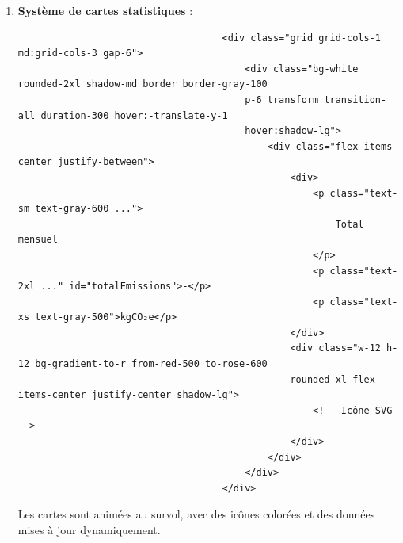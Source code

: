 \documentclass[a4paper,11pt]{article}
\begin{document}
\begin{enumerate}
                        \item \textbf{Système de cartes statistiques} :
                            \begin{tcolorbox}[colback=lightgray!6, colframe=black, left=-70mm, right=5mm, top=2mm, bottom=0mm, boxrule=0.1mm]
                                \begin{verbatim}
                                    <div class="grid grid-cols-1 md:grid-cols-3 gap-6">
                                        <div class="bg-white rounded-2xl shadow-md border border-gray-100 
                                        p-6 transform transition-all duration-300 hover:-translate-y-1 
                                        hover:shadow-lg">
                                            <div class="flex items-center justify-between">
                                                <div>
                                                    <p class="text-sm text-gray-600 ...">
                                                        Total mensuel
                                                    </p>
                                                    <p class="text-2xl ..." id="totalEmissions">-</p>
                                                    <p class="text-xs text-gray-500">kgCO₂e</p>
                                                </div>
                                                <div class="w-12 h-12 bg-gradient-to-r from-red-500 to-rose-600 
                                                rounded-xl flex items-center justify-center shadow-lg">
                                                    <!-- Icône SVG -->
                                                </div>
                                            </div>
                                        </div>
                                    </div>
                                \end{verbatim}
                            \end{tcolorbox}

                            \noindent Les cartes sont animées au survol, avec des icônes colorées et des données mises à jour dynamiquement.


\end{enumerate}
\end{document}
